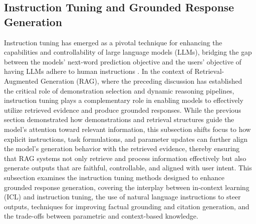 \documentclass[11pt]{article}
\begin{document}
\subsection{Instruction Tuning and Grounded Response Generation}

Instruction tuning has emerged as a pivotal technique for enhancing the capabilities and controllability of large language models (LLMs), bridging the gap between the models' next-word prediction objective and the users' objective of having LLMs adhere to human instructions \cite{ref137}. In the context of Retrieval-Augmented Generation (RAG), where the preceding discussion has established the critical role of demonstration selection and dynamic reasoning pipelines, instruction tuning plays a complementary role in enabling models to effectively utilize retrieved evidence and produce grounded responses. While the previous section demonstrated how demonstrations and retrieval structures guide the model's attention toward relevant information, this subsection shifts focus to how explicit instructions, task formulations, and parameter updates can further align the model's generation behavior with the retrieved evidence, thereby ensuring that RAG systems not only retrieve and process information effectively but also generate outputs that are faithful, controllable, and aligned with user intent. This subsection examines the instruction tuning methods designed to enhance grounded response generation, covering the interplay between in-context learning (ICL) and instruction tuning, the use of natural language instructions to steer outputs, techniques for improving factual grounding and citation generation, and the trade-offs between parametric and context-based knowledge.
\end{document}
